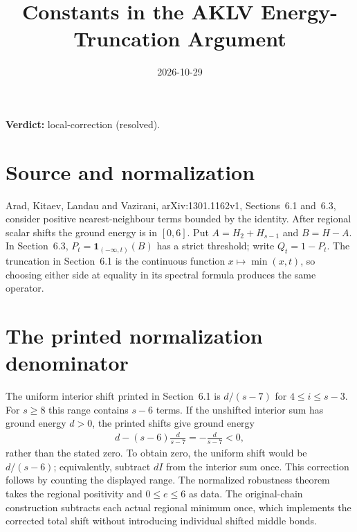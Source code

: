 \documentclass{article}
\title{Constants in the AKLV Energy-Truncation Argument}
\author{}
\date{2026-10-29}
\providecommand{\gapnote}[2]{\par\noindent\textbf{Verdict:} #1 (#2).\par}
\begin{document}
\maketitle
\gapnote{local-correction}{resolved}

\section{Source and normalization}
Arad, Kitaev, Landau and Vazirani, arXiv:1301.1162v1,
Sections~6.1 and~6.3, consider positive nearest-neighbour terms bounded
by the identity. After regional scalar shifts the ground energy is in
$[0,6]$. Put $A=H_2+H_{s-1}$ and $B=H-A$.
In Section~6.3, $P_t=\mathbf 1_{(-\infty,t)}(B)$ has a strict threshold;
write $Q_t=1-P_t$. The truncation in Section~6.1 is the continuous
function $x\mapsto\min(x,t)$, so choosing either side at equality in its
spectral formula produces the same operator.

\section{The printed normalization denominator}
The uniform interior shift printed in Section~6.1 is $d/(s-7)$ for
$4\le i\le s-3$. For $s\ge8$ this range contains $s-6$ terms. If the
unshifted interior sum has ground energy $d>0$, the printed shifts give
ground energy
\begin{align}
    d-(s-6)\frac{d}{s-7}=-\frac{d}{s-7}<0,
\end{align}
rather than the stated zero. To obtain zero, the uniform shift would
be $d/(s-6)$; equivalently, subtract $dI$ from the interior sum once.
This correction follows by counting the displayed range. The normalized
robustness theorem takes the regional positivity and $0\le e\le6$ as
data. The original-chain construction subtracts each actual regional
minimum once, which implements the corrected total shift without
introducing individual shifted middle bonds.
\end{document}
